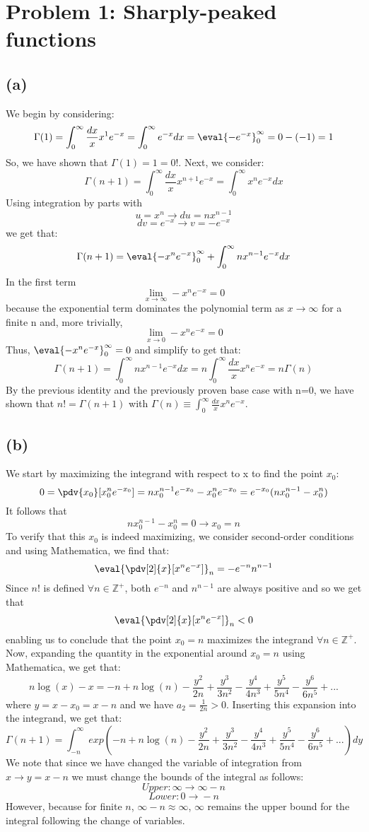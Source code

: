 \section*{Problem 1: Sharply-peaked functions}
{\bfseries
}
\subsection*{(a)}

{\bfseries 
}
We begin by considering:
\[\Gamma(1)=\int_{0}^{\infty} \frac{dx}{x} x^1 e^{-x}=\int_{0}^{\infty}  e^{-x}dx = \eval{-e^{-x}}_0^\infty = 0-(-1)=1\]
So, we have shown that \(\Gamma(1)=1=0!\).
Next, we consider:
\[\Gamma(n+1)=\int_{0}^{\infty} \frac{dx}{x} x^{n+1} e^{-x}=\int_{0}^{\infty}  x^n e^{-x}dx\]
Using integration by parts with
\[u=x^n\xrightarrow{} du=nx^{n-1}\]
\[dv=e^{-x}\xrightarrow{} v=-e^{-x}\]
we get that:
\[\Gamma(n+1)=\eval{-x^n e^{-x}}_0^\infty + \int_{0}^{\infty} nx^{n-1} e^{-x} dx\]
In the first term
\[\lim_{x\to\infty} -x^n e^{-x} = 0\]
because the exponential term dominates the polynomial term as \(x\xrightarrow{}\infty\) for a finite n and, more trivially, 
\[\lim_{x\to0} -x^n e^{-x} = 0\]
Thus, \(\eval{-x^n e^{-x}}_0^\infty=0\) and simplify to get that:
\[\Gamma(n+1)=\int_{0}^{\infty} nx^{n-1} e^{-x} dx=n\int_{0}^{\infty} \frac{dx}{x}x^{n} e^{-x}=n\Gamma(n)\]
By the previous identity and the previously proven base case with n=0, we have shown that \(n!=\Gamma(n+1)\) with \(\Gamma(n)\equiv \int_{0}^{\infty} \frac{dx}{x} x^{n} e^{-x}\).
\subsection*{(b)
}

{\bfseries 
}
We start by maximizing the integrand with respect to x to find the point $x_0$:
\[0=\pdv{x_0}[x_0^n e^{-x_0}]=nx_0^{n-1} e^{-x_0} -x_0^n e^{-x_0}=e^{-x_0}(nx_0^{n-1}-x_0^n) \]
It follows that
\[nx_0^{n-1}-x_0^n=0\xrightarrow{}x_0=n\]
To verify that this $x_0$ is indeed maximizing, we consider second-order conditions and using Mathematica, we find that:
\[\eval{\pdv[2]{x}[x^n e^{-x}]}_n = -e^{-n} n^{n-1} \]
Since $n!$ is defined \(\forall n\in\mathbb{Z}^+\), both $e^{-n}$ and $n^{n-1}$ are always positive and so we get that
\[\eval{\pdv[2]{x}[x^n e^{-x}]}_n<0\]
enabling us to conclude that the point $x_0=n$ maximizes the integrand \(\forall n\in\mathbb{Z}^+\).
Now, expanding the quantity in the exponential around $x_0=n$ using Mathematica, we get that:
\[n\log(x)-x= -n + n\log(n) - \frac{y^2}{2n} + \frac{y^3}{3 n^2} - \frac{y^4}{4n^3} + \frac{y^5}{5 n^4} - \frac{y^6}{6 n^5}+...\]
where $y=x-x_0=x-n$ and we have $a_2=\frac{1}{2n}>0$.
Inserting this expansion into the integrand, we get that:
\[\Gamma(n+1)=\int_{-n}^{\infty} exp(-n + n\log(n) - \frac{y^2}{2n} + \frac{y^3}{3 n^2} - \frac{y^4}{4n^3} + \frac{y^5}{5 n^4} - \frac{y^6}{6 n^5}+...)dy\]
We note that since we have changed the variable of integration from $x\rightarrow{}y=x-n$ we must change the bounds of the integral as follows:
\[Upper: \infty\rightarrow{}\infty-n\]
\[Lower: 0\rightarrow{}-n\]
However, because for finite $n$, $\infty-n \approx \infty$, $\infty$ remains the upper bound for the integral following the change of variables.
